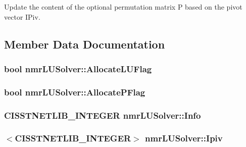 Update the content of the optional permutation matrix P based on the pivot vector I\-Piv. 

\subsection{Member Data Documentation}
\hypertarget{classnmr_l_u_solver_a34bf65decc10c0ce0b20697404dcb328}{
\subsubsection[{Allocate\-L\-U\-Flag}]{\setlength{\rightskip}{0pt plus 5cm}bool nmr\-L\-U\-Solver\-::\-Allocate\-L\-U\-Flag\hspace{0.3cm}{\ttfamily [protected]}}}\label{classnmr_l_u_solver_a34bf65decc10c0ce0b20697404dcb328}
\hypertarget{classnmr_l_u_solver_aedb65694fb1672b67cf4b1e731e3438a}{
\subsubsection[{Allocate\-P\-Flag}]{\setlength{\rightskip}{0pt plus 5cm}bool nmr\-L\-U\-Solver\-::\-Allocate\-P\-Flag\hspace{0.3cm}{\ttfamily [protected]}}}\label{classnmr_l_u_solver_aedb65694fb1672b67cf4b1e731e3438a}
\hypertarget{classnmr_l_u_solver_a7a5bf0600413afceac134473b0651698}{
\subsubsection[{Info}]{\setlength{\rightskip}{0pt plus 5cm}C\-I\-S\-S\-T\-N\-E\-T\-L\-I\-B\-\_\-\-I\-N\-T\-E\-G\-E\-R nmr\-L\-U\-Solver\-::\-Info\hspace{0.3cm}{\ttfamily [protected]}}}\label{classnmr_l_u_solver_a7a5bf0600413afceac134473b0651698}
\hypertarget{classnmr_l_u_solver_ad1cd8e579ea67dbebc1586400a82ee58}{
\subsubsection[{Ipiv}]{$<$C\-I\-S\-S\-T\-N\-E\-T\-L\-I\-B\-\_\-\-I\-N\-T\-E\-G\-E\-R$>$ nmr\-L\-U\-Solver\-::\-Ipiv\hspace{0.3cm}{\ttfamily [protected]}}}\label{classnmr_l_u_solver_ad1cd8e579ea67dbebc1586400a82ee58}
